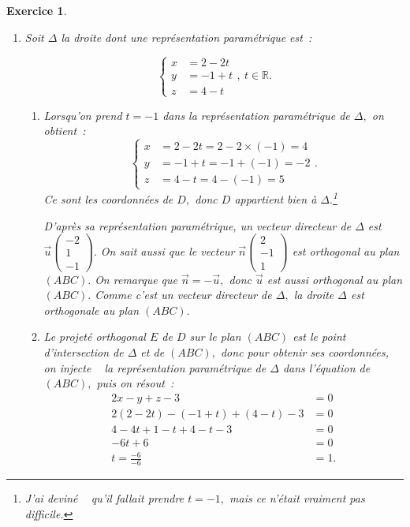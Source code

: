 \documentclass[10pt]{article}
\newtheorem{exo}{Exercice}
\begin{document}
\begin{exo}
\begin{enumerate}
\begin{enumerate}
Conclusion~:
\[(ABC):2x-y+z-3=0.\]



\end{enumerate}
\item Soit $\Delta$ la droite dont une représentation paramétrique est~:

\[\begin{cases}x&=2-2t\\y&=-1+t\\z&=4-t\end{cases},~t\in\mathbb{R}.\]
\begin{enumerate}
\item Lorsqu'on prend $t=-1$ dans la représentation paramétrique de $\Delta,$ on obtient~:
\[\begin{cases}x&=2-2t=2-2\times(-1)=4\\y&=-1+t=-1+(-1)=-2\\z&=4-t=4-(-1)=5\end{cases}.\] Ce sont les coordonnées de $D,$ donc $D$ appartient bien à $\Delta.$\footnote{J'ai \og deviné \fg~{} qu'il fallait prendre $t=-1,$ mais ce n'était vraiment pas difficile.}

\medskip

D'après sa représentation paramétrique, un vecteur directeur de $\Delta$ est $\overrightarrow{u}\begin{pmatrix}-2\\1\\-1\end{pmatrix}.$ On sait aussi que le vecteur $\overrightarrow{n}\begin{pmatrix}2\\-1\\1\end{pmatrix}$ est orthogonal au plan $(ABC).$ On remarque que $\overrightarrow{n}=-\overrightarrow{u},$ donc $\overrightarrow{u}$ est aussi orthogonal au plan $(ABC).$ Comme c'est un vecteur directeur de $\Delta,$ la droite $\Delta$ est orthogonale au plan $(ABC).$


\item Le projeté orthogonal $E$ de $D$ sur le plan $(ABC)$ est le point d'intersection de $\Delta$ et de $(ABC),$ donc pour obtenir ses coordonnées, on \og injecte \fg~{} la représentation paramétrique de $\Delta$ dans l'équation de $(ABC),$ puis on résout~:
\begin{align*}
2x-y+z-3&=0\\
2(2-2t)-(-1+t)+(4-t)-3&=0\\
4-4t+1-t+4-t-3&=0\\
-6t+6&=0\\
t=\frac{-6}{-6}&=1.
\end{align*}


\end{enumerate}
\end{enumerate}
\end{exo}
\end{document}
